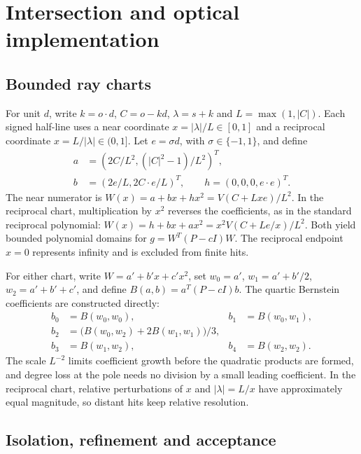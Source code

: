 \documentclass{jcgt}
\begin{document}
\section{Intersection and optical
implementation}\label{intersection-and-optical-implementation}

\subsection{Bounded ray charts}\label{bounded-ray-charts}

For unit \(d\), write \(k=o\cdot d\), \(C=o-kd\), \(\lambda=s+k\) and
\(L=\max(1,|C|)\). Each signed half-line uses a near coordinate
\(x=|\lambda|/L\in[0,1]\) and a reciprocal coordinate
\(x=L/|\lambda|\in(0,1]\). Let \(e=\sigma d\), with
\(\sigma\in\{-1,1\}\), and define \[
\begin{aligned}
a&=(2C/L^2,(|C|^2-1)/L^2)^T,\\
b&=(2e/L,2C\cdot e/L)^T,\qquad h=(0,0,0,e\cdot e)^T.
\end{aligned}
\] The near numerator is \(W(x)=a+bx+hx^2=V(C+Lxe)/L^2\). In the
reciprocal chart, multiplication by \(x^2\) reverses the coefficients,
as in the standard reciprocal polynomial:
\(W(x)=h+bx+ax^2=x^2V(C+Le/x)/L^2\). Both yield bounded polynomial
domains for \(g=W^T(P-cI)W\). The reciprocal endpoint \(x=0\) represents
infinity and is excluded from finite hits.

For either chart, write \(W=a'+b'x+c'x^2\), set \(w_0=a'\),
\(w_1=a'+b'/2\), \(w_2=a'+b'+c'\), and define \(B(a,b)=a^T(P-cI)b\). The
quartic Bernstein coefficients are constructed directly: \[
\begin{aligned}
b_0&=B(w_0,w_0), & b_1&=B(w_0,w_1),\\
b_2&=\bigl(B(w_0,w_2)+2B(w_1,w_1)\bigr)/3,\\
b_3&=B(w_1,w_2), & b_4&=B(w_2,w_2).
\end{aligned}
\] The scale \(L^{-2}\) limits coefficient growth before the quadratic
products are formed, and degree loss at the pole needs no division by a
small leading coefficient. In the reciprocal chart, relative
perturbations of \(x\) and \(|\lambda|=L/x\) have approximately equal
magnitude, so distant hits keep relative resolution.

\subsection{Isolation, refinement and
acceptance}\label{isolation-refinement-and-acceptance}
\end{document}

